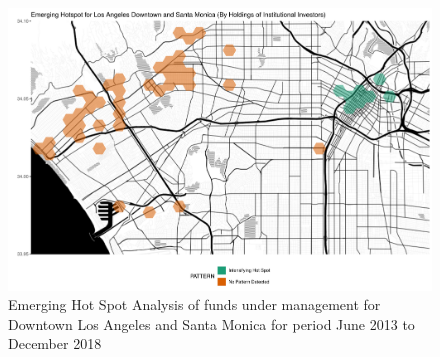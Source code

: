 \begin{figure}
	\centering
	\includegraphics[width=1\linewidth]{Figures/ChapterIV/LA_Money_EH_Downtown}
	\caption[Emerging Hot Spot Analysis of Funds Under Management for Downtown Los Angeles and Santa Monica 2013-2018]{Emerging Hot Spot Analysis of funds under management for Downtown Los Angeles and Santa Monica for period June 2013 to December 2018}
	\label{fig:LAmoneyhotspot_Downtown}
\end{figure}

